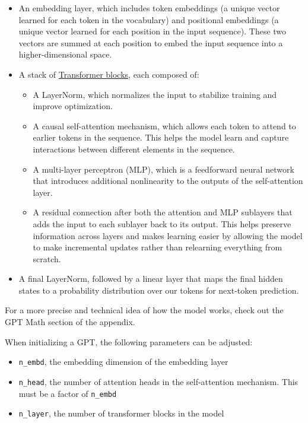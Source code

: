 \documentclass[11pt]{article}
\providecommand{\tightlist}{%
      \setlength{\itemsep}{0pt}\setlength{\parskip}{0pt}}
\begin{document}
\begin{itemize}
\item
  An embedding layer, which includes token embeddings (a unique vector
  learned for each token in the vocabulary) and positional embeddings (a
  unique vector learned for each position in the input sequence). These
  two vectors are summed at each position to embed the input sequence
  into a higher-dimensional space.
\item
  A stack of \href{https://arxiv.org/abs/1706.03762}{Transformer blocks}, each composed of:

  \begin{itemize}
  \tightlist
  \item
    A LayerNorm, which normalizes the input to stabilize training and
    improve optimization.
  \item
    A causal self-attention mechanism, which allows each token to attend
    to earlier tokens in the sequence. This helps the model learn and
    capture interactions between different elements in the sequence.
  \item
    A multi-layer perceptron (MLP), which is a feedforward neural
    network that introduces additional nonlinearity to the outputs of
    the self-attention layer.
  \item
    A residual connection after both the attention and MLP sublayers
    that adds the input to each sublayer back to its output. This helps
    preserve information across layers and makes learning easier by
    allowing the model to make incremental updates rather than
    relearning everything from scratch.
  \end{itemize}
\item
  A final LayerNorm, followed by a linear layer that maps the final
  hidden states to a probability distribution over our tokens for
  next-token prediction.
\end{itemize}

For a more precise and technical idea of how the model works, check out
the GPT Math section of the appendix.

When initializing a GPT, the following parameters can be adjusted:

\begin{itemize}
\tightlist
\item
  \texttt{n\_embd}, the embedding dimension of the embedding layer
\item
  \texttt{n\_head}, the number of attention heads in the self-attention
  mechanism. This must be a factor of \texttt{n\_embd}
\item
  \texttt{n\_layer}, the number of transformer blocks in the model
\end{itemize}
\end{document}
